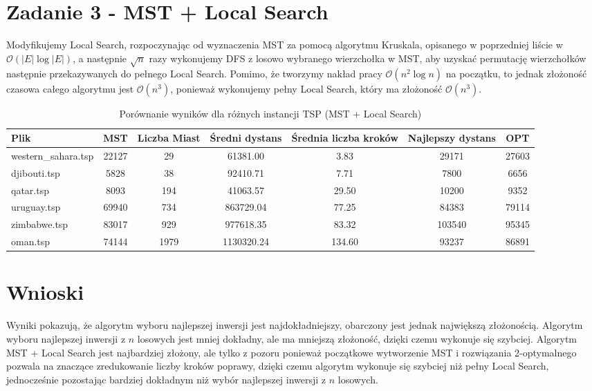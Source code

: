 \documentclass{article}
\begin{document}
\section{Zadanie 3 - MST + Local Search}

Modyfikujemy Local Search, rozpoczynając od wyznaczenia MST za pomocą algorytmu Kruskala, opisanego w poprzedniej liście w $\mathcal{O}(|E| \log |E|)$,
a następnie $\sqrt{n}$ razy wykonujemy DFS z losowo wybranego wierzchołka w MST, aby uzyskać permutację wierzchołków następnie przekazywanych do pełnego Local Search.
Pomimo, że tworzymy nakład pracy $\mathcal{O}(n^2 \log n)$ na początku, to jednak złożoność czasowa całego algorytmu jest $\mathcal{O}(n^3)$, ponieważ wykonujemy pełny Local Search, który ma złożoność $\mathcal{O}(n^3)$.

\begin{table}[H]
    \centering
    \caption{Porównanie wyników dla różnych instancji TSP (MST + Local Search)}
    \begin{tabular}{lcccccc}
        \toprule
        Plik & MST & Liczba Miast & Średni dystans & Średnia liczba kroków & Najlepszy dystans & OPT  \\
        \midrule
        western\_sahara.tsp & 22127 & 29  & 61381.00  & 3.83   & 29171   & 27603  \\
        djibouti.tsp        & 5828 & 38  & 92410.71  & 7.71   & 7800    & 6656  \\
        qatar.tsp           & 8093 & 194 & 41063.57  & 29.50  & 10200   & 9352  \\
        uruguay.tsp         & 69940 & 734 & 863729.04 & 77.25  & 84383   & 79114  \\
        zimbabwe.tsp        & 83017 & 929 & 977618.35 & 83.32  & 103540  & 95345  \\
        oman.tsp            & 74144 & 1979 & 1130320.24 & 134.60 & 93237 & 86891  \\
        \bottomrule
    \end{tabular}
\end{table}

\section{Wnioski}

Wyniki pokazują, że algorytm wyboru najlepszej inwersji jest najdokładniejszy, obarczony jest jednak
największą złożonością. Algorytm wyboru najlepszej inwersji z $n$ losowych jest mniej dokładny, ale ma mniejszą złożoność,
dzięki czemu wykonuje się szybciej.
Algorytm MST + Local Search jest najbardziej złożony, ale tylko z pozoru ponieważ początkowe wytworzenie MST i rozwiązania
2-optymalnego pozwala na znaczące zredukowanie liczby kroków poprawy, dzięki czemu algorytm wykonuje się szybciej niż
pełny Local Search, jednocześnie pozostając bardziej dokładnym niż wybór najlepszej inwersji z $n$ losowych. 
\end{document}
